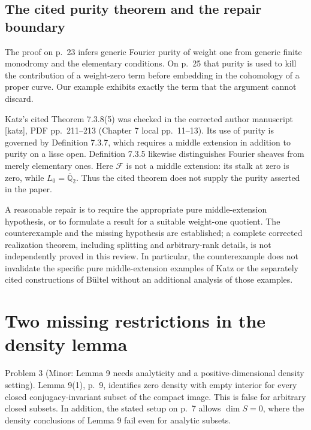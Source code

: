 \documentclass[10pt]{article}
\begin{document}
\subsection*{The cited purity theorem and the repair boundary}
The proof on p. 23 infers generic Fourier purity of weight one from generic finite monodromy and the elementary conditions. On p. 25 that purity is used to kill the contribution of a weight-zero term before embedding in the cohomology of a proper curve. Our example exhibits exactly the term that the argument cannot discard.\par
Katz’s cited Theorem 7.3.8(5) was checked in the corrected author manuscript [katz], PDF pp. 211–213 (Chapter 7 local pp. 11–13). Its use of purity is governed by Definition 7.3.7, which requires a middle extension in addition to purity on a lisse open. Definition 7.3.5 likewise distinguishes Fourier sheaves from merely elementary ones. Here \(\mathcal F\) is not a middle extension: its stalk at zero is zero, while \(L_0=\overline{\mathbb Q}_2\). Thus the cited theorem does not supply the purity asserted in the paper.\par
A reasonable repair is to require the appropriate pure middle-extension hypothesis, or to formulate a result for a suitable weight-one quotient. The counterexample and the missing hypothesis are established; a complete corrected realization theorem, including splitting and arbitrary-rank details, is not independently proved in this review. In particular, the counterexample does not invalidate the specific pure middle-extension examples of Katz or the separately cited constructions of Bültel without an additional analysis of those examples.\par
\section*{Two missing restrictions in the density lemma}
Problem 3 (Minor: Lemma 9 needs analyticity and a positive-dimensional density setting).  Lemma 9(1), p. 9, identifies zero density with empty interior for every closed conjugacy-invariant subset of the compact image. This is false for arbitrary closed subsets. In addition, the stated setup on p. 7 allows \(\dim S=0\), where the density conclusions of Lemma 9 fail even for analytic subsets.\par
\end{document}
